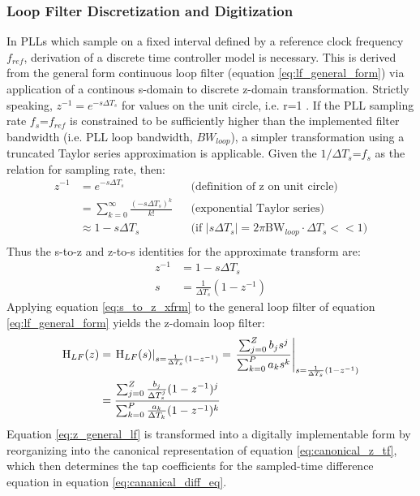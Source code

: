 		\subsubsection{Loop Filter Discretization and Digitization}\label{lf-discretization}
			In PLLs which sample on a fixed interval defined by a reference clock frequency $f_{ref}$, derivation of a discrete time controller model is necessary. This is derived from the general form continuous loop filter (equation \ref{eq:lf_general_form}) via application of a continous s-domain to discrete z-domain transformation. Strictly speaking, $z^{-1} = e^{-s\Delta T_s}$ for values on the unit circle, i.e. r=1 \cite{proakis_1993_z}. If the PLL sampling rate $f_s$=$f_{ref}$ is constrained to be sufficiently higher than the implemented filter bandwidth (i.e. PLL loop bandwidth, $BW_{loop}$), a simpler transformation using a truncated Taylor series approximation is applicable. Given the $1/\Delta T_s$=$f_{s}$ as the relation for sampling rate, then:
			\begin{align*}
				z^{-1} &= e^{-s\Delta T_s} && \text{(definition of z on unit circle)} \\
				&= \sum_{k=0}^\infty\frac{(-s\Delta T_s)^k}{k!} && \text{(exponential Taylor series)} \\
				&\approx 1-s\Delta T_s &&\text{(if $|s\Delta T_s| = 2\pi\mathrm{BW}_{loop}\cdot \Delta T_s << 1$)} \\
			\end{align*}
			Thus the s-to-z and z-to-s identities for the approximate transform are:
			\begin{align}
				z^{-1} &= 1-s\Delta T_s\\
				s &= \frac{1}{\Delta T_s}(1-z^{-1}) \label{eq:s_to_z_xfrm}
			\end{align}
			Applying equation \ref{eq:s_to_z_xfrm} to the general loop filter of equation \ref{eq:lf_general_form} yields the z-domain loop filter:
			\begin{align}
				\textnormal{H}_{LF}(z) &= \left.\textnormal{H}_{LF}(s)\right\vert_{s=\frac{1}{\Delta T_s}(1-z^{-1})} = \left.\frac{\sum_{j=0}^Z b_js^j}{\sum_{k=0}^P a_ks^k}\right\vert_{s=\frac{1}{\Delta T_s}(1-z^{-1})}\\
				&= \frac{\sum_{j=0}^Z \frac{b_j}{\Delta T_s^j}(1-z^{-1})^j}{\sum_{k=0}^P \frac{a_k}{\Delta T_k}(1-z^{-1})^k} \label{eq:z_general_lf}
			\end{align}
			Equation \ref{eq:z_general_lf} is transformed into a digitally implementable form by reorganizing into the canonical representation of equation \ref{eq:canonical_z_tf}, which then determines the tap coefficients for the sampled-time difference equation in equation \ref{eq:cananical_diff_eq}. 
